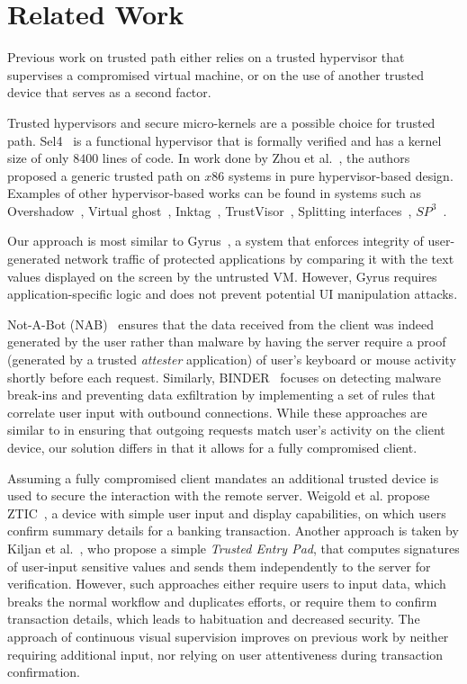 \section{Related Work} 
\label{integriscreen:sec:relatedWork}

Previous work on trusted path either relies on a trusted hypervisor that supervises a compromised virtual machine, or on the use of another trusted device that serves as a second factor.

Trusted hypervisors and secure micro-kernels are a possible choice for trusted path. Sel4~\cite{klein2009sel4} is a functional hypervisor that is formally verified and has a kernel size of only $8400$ lines of code. In work done by Zhou et al.~\cite{x86}, the authors proposed a generic trusted path on $x86$ systems in pure hypervisor-based design. Examples of other hypervisor-based works can be found in systems such as Overshadow~\cite{Overshadow}, Virtual ghost~\cite{criswell2014virtual}, Inktag~\cite{hofmann2013inktag}, TrustVisor~\cite{mccune2010trustvisor}, Splitting interfaces~\cite{ta2006splitting}, $SP^3$~\cite{yang2008using}.

Our approach is most similar to Gyrus~\cite{gyrus}, a system that enforces integrity of user-generated network traffic of protected applications by comparing it with the text values displayed on the screen by the untrusted VM.
However, Gyrus requires application-specific logic and does not prevent potential UI manipulation attacks.

Not-A-Bot (NAB)~\cite{nab} ensures that the data received from the client was indeed generated by the user rather than malware by having the server require a proof (generated by a trusted \emph{attester} application) of user's keyboard or mouse activity shortly before each request.
Similarly, BINDER~\cite{binder} focuses on detecting malware break-ins and preventing data exfiltration by implementing a set of rules that correlate user input with outbound connections.
While these approaches are similar to \sysname in ensuring that outgoing requests match user's activity on the client device, our solution differs in that it allows for a fully compromised client.


Assuming a fully compromised client mandates an additional trusted device is used to secure the interaction with the remote server.
Weigold et al. propose ZTIC~\cite{weigold2011}, a device with simple user input and display capabilities, on which users confirm summary details for a banking transaction.
Another approach is taken by Kiljan et al.~\cite{6978928}, who propose a simple \emph{Trusted Entry Pad}, that computes signatures of user-input sensitive values and sends them independently to the server for verification.
However, such approaches either require users to input data, which breaks the normal workflow and duplicates efforts, or require them to confirm transaction details, which leads to habituation and decreased security.
The approach of continuous visual supervision improves on previous work by neither requiring additional input, nor relying on user attentiveness during transaction confirmation.